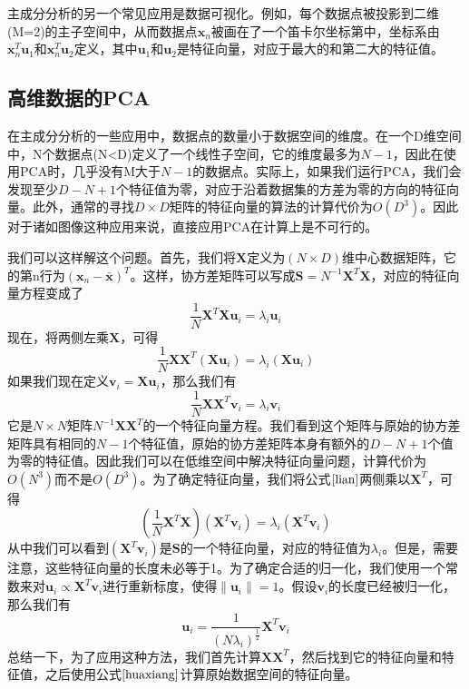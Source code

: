 主成分分析的另一个常见应用是数据可视化。例如，每个数据点被投影到二维(M=2)的主子空间中，从而数据点$\boldsymbol{x}_n$被画在了一个笛卡尔坐标第中，坐标系由$\boldsymbol{x}_n^T\boldsymbol{u}_1$和$\boldsymbol{x}_n^T\boldsymbol{u}_2$定义，其中$\boldsymbol{u}_1$和$\boldsymbol{u}_2$是特征向量，对应于最大的和第二大的特征值。
\subsection*{高维数据的PCA}
在主成分分析的一些应用中，数据点的数量小于数据空间的维度。在一个D维空间中，N个数据点(N<D)定义了一个线性子空间，它的维度最多为$N-1$，因此在使用PCA时，几乎没有M大于$N-1$的数据点。实际上，如果我们运行PCA，我们会发现至少$D-N+1$个特征值为零，对应于沿着数据集的方差为零的方向的特征向量。此外，通常的寻找$D\times D$矩阵的特征向量的算法的计算代价为$O(D^3)$。因此对于诸如图像这种应用来说，直接应用PCA在计算上是不可行的。

我们可以这样解这个问题。首先，我们将$\boldsymbol{X}$定义为$(N\times D)$维中心数据矩阵，它的第n行为$(\boldsymbol{x}_n-\bar{\boldsymbol{x}})^T$。这样，协方差矩阵可以写成$\boldsymbol{S}=N^{-1}\boldsymbol{X}^T\boldsymbol{X}$，对应的特征向量方程变成了
\begin{equation}
	\frac{1}{N}\boldsymbol{X}^T\boldsymbol{X}\boldsymbol{u}_i=\lambda_i\boldsymbol{u}_i
\end{equation}
现在，将两侧左乘$\boldsymbol{X}$，可得
\begin{equation}
	\frac{1}{N}\boldsymbol{X}\boldsymbol{X}^T(\boldsymbol{X}\boldsymbol{u}_i)=\lambda_i(\boldsymbol{Xu}_i)
\end{equation}
如果我们现在定义$\boldsymbol{v}_i=\boldsymbol{Xu}_i$，那么我们有
\begin{equation}
\label{lian}
	\frac{1}{N}\boldsymbol{XX}^T\boldsymbol{v}_i=\lambda_i\boldsymbol{v}_i
\end{equation}
它是$N\times N$矩阵$N^{-1}\boldsymbol{XX}^T$的一个特征向量方程。我们看到这个矩阵与原始的协方差矩阵具有相同的$N-1$个特征值，原始的协方差矩阵本身有额外的$D-N+1$个值为零的特征值。因此我们可以在低维空间中解决特征向量问题，计算代价为$O(N^3)$而不是$O(D^3)$。为了确定特征向量，我们将公式$\ref{lian}$两侧乘以$\boldsymbol{X}^T$，可得
\begin{equation}
	\left(\frac{1}{N}\boldsymbol{X}^T\boldsymbol{X}\right)(\boldsymbol{X}^T\boldsymbol{v}_i)=\lambda_i(\boldsymbol{X}^T\boldsymbol{v}_i)
\end{equation}
从中我们可以看到$(\boldsymbol{X}^T\boldsymbol{v}_i)$是$\boldsymbol{S}$的一个特征向量，对应的特征值为$\lambda_i$。但是，需要注意，这些特征向量的长度未必等于1。为了确定合适的归一化，我们使用一个常数来对$\boldsymbol{u}_i\propto \boldsymbol{X}^T\boldsymbol{v}_i$进行重新标度，使得$\lVert \boldsymbol{u}_i\rVert=1$。假设$\boldsymbol{v}_i$的长度已经被归一化，那么我们有
\begin{equation}
\label{huaxiang}
	\boldsymbol{u}_i=\frac{1}{(N\lambda_i)^{\frac{1}{2}}}\boldsymbol{X}^T\boldsymbol{v}_i
\end{equation}
总结一下，为了应用这种方法，我们首先计算$\boldsymbol{XX}^T$，然后找到它的特征向量和特征值，之后使用公式$\ref{huaxiang}$计算原始数据空间的特征向量。